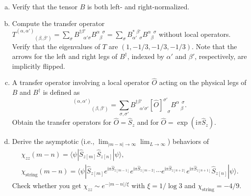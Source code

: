 \documentclass[11pt,a4paper,oneside]{article}
\begin{document}
\begin{enumerate}[(a)]

\item
Verify that the tensor $B$ is both left- and right-normalized.

\item
Compute the transfer operator $T^{(\alpha, \alpha')}_{\phantom{(\alpha, \alpha')} (\beta, \beta')} = \sum_{\sigma} B^{\dagger \beta'}_{\phantom{\beta'} \alpha'  \sigma} B^{\alpha \phantom{\beta} \sigma}_{\phantom{\alpha} \beta} = \sum_{\sigma} B^{* \,\, \beta'}_{\alpha' \,\,\, \sigma} B^{\alpha \phantom{\beta} \sigma}_{\phantom{\alpha} \beta}$ without local operators.
Verify that the eigenvalues of $T$ are $(1, -1/3, -1/3, -1/3)$.
Note that the arrows for the left and right legs of $B^\dagger$, indexed by $\alpha'$ and $\beta'$, respectively, are implicitly flipped.

\item
A transfer operator involving a local operator $\hat{O}$ acting on the physical legs of $B$ and $B^\dagger$ is defined as
\begin{equation}
[T_{\hat{O}}]^{(\alpha, \alpha')}_{\phantom{(\alpha, \alpha')} (\beta, \beta')} 
= \sum_{\sigma, \sigma'} B^{\dagger \beta'}_{\phantom{\beta'} \alpha'  \sigma'}
[\hat{O}]^{\sigma'}_{\phantom{\sigma'} \sigma}
B^{\alpha \phantom{\beta} \sigma}_{\phantom{\alpha'} \beta} .
\end{equation}
Obtain the transfer operators for $\hat{O} = \hat{S}_z$ and for $\hat{O} = \exp (\mathrm{i} \pi \hat{S}_z)$.

\item 
Derive the asymptotic (i.e., $\lim_{|m - n| \to \infty} \lim_{L \to \infty}$) behaviors of
\begin{equation}
\begin{gathered}
\chi_{zz} (m - n) = \langle \psi | \hat{S}_{z [m]} \hat{S}_{z [n]} | \psi \rangle,
\\
\chi_\mathrm{string} (m - n) = \langle \psi | \hat{S}_{z [m]}
e^{\mathrm{i} \pi \hat{S}_{z[m-1]}}
e^{\mathrm{i} \pi \hat{S}_{z[m-2]}}
\cdots
e^{\mathrm{i} \pi \hat{S}_{z[n+2]}}
e^{\mathrm{i} \pi \hat{S}_{z[n+1]}}
\hat{S}_{z [n]} | \psi \rangle .
\end{gathered}
\end{equation}
Check whether you get $\chi_{zz} \sim e^{- |m - n| / \xi}$ with $\xi = 1/\log 3$ and $\chi_\mathrm{string} = -4/9$.

\end{enumerate}
\end{document}

